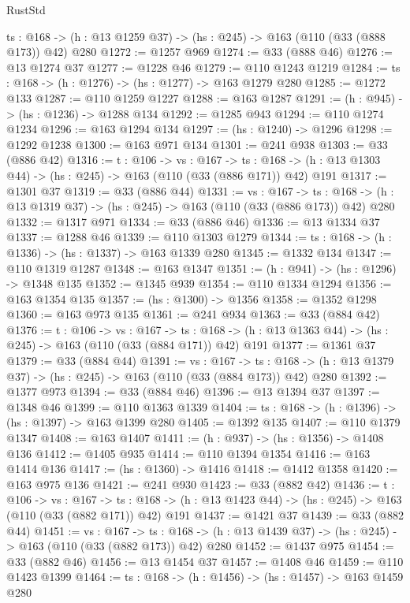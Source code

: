 \begin{lexlean}{RustStd}
\begin{coremodule}
{\begin{coremodule}
{{{{{  {ts : @168} -> (h : @13 @1259 @37) -> (hs : @245) -> @163 (@110 (@33 (@888 @173)) @42) @280
@1272 := @1257 @969
@1274 := @33 (@888 @46)
@1276 := @13 @1274 @37
@1277 := @1228 @46
@1279 := @110 @1243 @1219
@1284 := {ts : @168} -> (h : @1276) -> (hs : @1277) -> @163 @1279 @280
@1285 := @1272 @133
@1287 := @110 @1259 @1227
@1288 := @163 @1287
@1291 := (h : @945) -> (hs : @1236) -> @1288 @134
@1292 := @1285 @943
@1294 := @110 @1274 @1234
@1296 := @163 @1294 @134
@1297 := (hs : @1240) -> @1296
@1298 := @1292 @1238
@1300 := @163 @971 @134
@1301 := @241 @938
@1303 := @33 (@886 @42)
@1316 := {t : @106} ->
  {vs : @167} ->
  {ts : @168} -> (h : @13 @1303 @44) -> (hs : @245) -> @163 (@110 (@33 (@886 @171)) @42) @191
@1317 := @1301 @37
@1319 := @33 (@886 @44)
@1331 := {vs : @167} ->
  {ts : @168} -> (h : @13 @1319 @37) -> (hs : @245) -> @163 (@110 (@33 (@886 @173)) @42) @280
@1332 := @1317 @971
@1334 := @33 (@886 @46)
@1336 := @13 @1334 @37
@1337 := @1288 @46
@1339 := @110 @1303 @1279
@1344 := {ts : @168} -> (h : @1336) -> (hs : @1337) -> @163 @1339 @280
@1345 := @1332 @134
@1347 := @110 @1319 @1287
@1348 := @163 @1347
@1351 := (h : @941) -> (hs : @1296) -> @1348 @135
@1352 := @1345 @939
@1354 := @110 @1334 @1294
@1356 := @163 @1354 @135
@1357 := (hs : @1300) -> @1356
@1358 := @1352 @1298
@1360 := @163 @973 @135
@1361 := @241 @934
@1363 := @33 (@884 @42)
@1376 := {t : @106} ->
  {vs : @167} ->
  {ts : @168} -> (h : @13 @1363 @44) -> (hs : @245) -> @163 (@110 (@33 (@884 @171)) @42) @191
@1377 := @1361 @37
@1379 := @33 (@884 @44)
@1391 := {vs : @167} ->
  {ts : @168} -> (h : @13 @1379 @37) -> (hs : @245) -> @163 (@110 (@33 (@884 @173)) @42) @280
@1392 := @1377 @973
@1394 := @33 (@884 @46)
@1396 := @13 @1394 @37
@1397 := @1348 @46
@1399 := @110 @1363 @1339
@1404 := {ts : @168} -> (h : @1396) -> (hs : @1397) -> @163 @1399 @280
@1405 := @1392 @135
@1407 := @110 @1379 @1347
@1408 := @163 @1407
@1411 := (h : @937) -> (hs : @1356) -> @1408 @136
@1412 := @1405 @935
@1414 := @110 @1394 @1354
@1416 := @163 @1414 @136
@1417 := (hs : @1360) -> @1416
@1418 := @1412 @1358
@1420 := @163 @975 @136
@1421 := @241 @930
@1423 := @33 (@882 @42)
@1436 := {t : @106} ->
  {vs : @167} ->
  {ts : @168} -> (h : @13 @1423 @44) -> (hs : @245) -> @163 (@110 (@33 (@882 @171)) @42) @191
@1437 := @1421 @37
@1439 := @33 (@882 @44)
@1451 := {vs : @167} ->
  {ts : @168} -> (h : @13 @1439 @37) -> (hs : @245) -> @163 (@110 (@33 (@882 @173)) @42) @280
@1452 := @1437 @975
@1454 := @33 (@882 @46)
@1456 := @13 @1454 @37
@1457 := @1408 @46
@1459 := @110 @1423 @1399
@1464 := {ts : @168} -> (h : @1456) -> (hs : @1457) -> @163 @1459 @280
}}}}}
\end{coremodule}}
\end{coremodule}
\end{lexlean}
